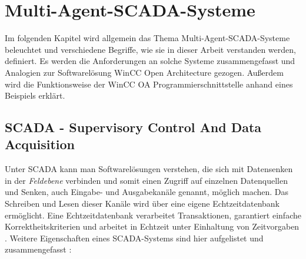 \chapter{Multi-Agent-SCADA-Systeme}
\label{cha:scadasysteme}

Im folgenden Kapitel wird allgemein das Thema Multi-Agent-SCADA-Systeme beleuchtet und verschiedene Begriffe, wie sie in dieser Arbeit verstanden werden, definiert.
Es werden die Anforderungen an solche Systeme zusammengefasst und Analogien zur Softwarelösung WinCC Open Architecture gezogen. Außerdem wird die Funktionsweise
der WinCC OA Programmierschnittstelle anhand eines Beispiels erklärt.

\section{SCADA - Supervisory Control And Data Acquisition}

Unter SCADA kann man Softwarelösungen verstehen, die sich mit Datensenken in der \textit{Feldebene} verbinden 
und somit einen Zugriff auf einzelnen Datenquellen und Senken, auch Eingabe- und Ausgabekanäle genannt, möglich machen. 
Das Schreiben und Lesen dieser Kanäle wird über eine eigene Echtzeitdatenbank ermöglicht. 
Eine Echtzeitdatenbank verarbeitet Transaktionen, garantiert einfache Korrektheitskriterien und arbeitet in Echtzeit unter Einhaltung 
von Zeitvorgaben \cite{realTimeDB}. Weitere Eigenschaften eines SCADA-Systems sind hier aufgelistet und zusammengefasst 
\cite{whatIsScada}:

